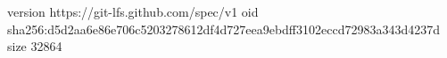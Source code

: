 version https://git-lfs.github.com/spec/v1
oid sha256:d5d2aa6e86e706c5203278612df4d727eea9ebdff3102eccd72983a343d4237d
size 32864
